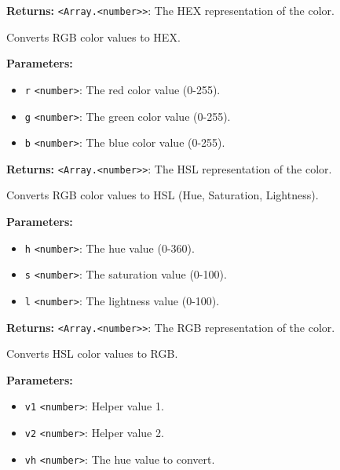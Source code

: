 \documentclass[12pt,a4paper]{article}
\begin{document}
\noindent \textbf{Returns:} \texttt{<Array.<number>>}: The HEX representation of the color.

\noindent Converts RGB color values to HEX.

\vspace{5mm}
\noindent {}


\noindent \textbf{Parameters:}
\begin{itemize}
  \item \texttt{r} \texttt{<number>}: The red color value (0-255).
  \item \texttt{g} \texttt{<number>}: The green color value (0-255).
  \item \texttt{b} \texttt{<number>}: The blue color value (0-255).
\end{itemize}

\noindent \textbf{Returns:} \texttt{<Array.<number>>}: The HSL representation of the color.

\noindent Converts RGB color values to HSL (Hue, Saturation, Lightness).

\vspace{5mm}
\noindent {}


\noindent \textbf{Parameters:}
\begin{itemize}
  \item \texttt{h} \texttt{<number>}: The hue value (0-360).
  \item \texttt{s} \texttt{<number>}: The saturation value (0-100).
  \item \texttt{l} \texttt{<number>}: The lightness value (0-100).
\end{itemize}

\noindent \textbf{Returns:} \texttt{<Array.<number>>}: The RGB representation of the color.

\noindent Converts HSL color values to RGB.

\vspace{5mm}
\noindent {}


\noindent \textbf{Parameters:}
\begin{itemize}
  \item \texttt{v1} \texttt{<number>}: Helper value 1.
  \item \texttt{v2} \texttt{<number>}: Helper value 2.
  \item \texttt{vh} \texttt{<number>}: The hue value to convert.
\end{itemize}
\end{document}
